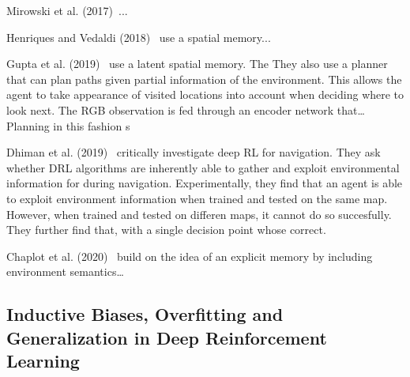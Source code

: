 

Mirowski et al. (2017)~\cite{mirowski_navigate_2017}...

Henriques and Vedaldi (2018)~\cite{henriques_vedaldi_2018} use a spatial memory...

Gupta et al. (2019)~\cite{gupta_cognitive_2019} use a latent spatial memory.
The 
They also use a planner that can plan paths given partial information of the environment.
This allows the agent to take appearance of visited locations into account when deciding where to look next.
The RGB observation is fed through an encoder network that\dots
Planning in this fashion s

Dhiman et al. (2019)~\cite{dhiman_critical_2019} critically investigate deep RL for navigation.
They ask whether DRL algorithms are inherently able to gather and exploit environmental information for during navigation.
Experimentally, they find that an agent is able to exploit environment information when trained and tested on the same map.
However, when trained and tested on differen maps, it cannot do so succesfully.
They further find that, with a single decision point whose correct.

Chaplot et al. (2020)~\cite{chaplot_semantic_2020} build on the idea of an explicit memory by including environment semantics\dots

\subsection{Inductive Biases, Overfitting and Generalization in Deep Reinforcement Learning}


